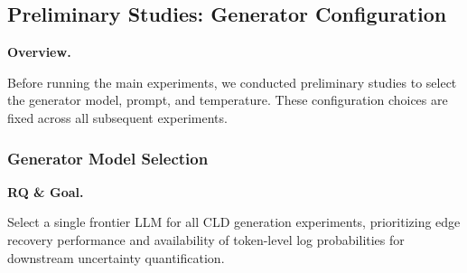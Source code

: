 \begingroup
\setlength{\leftskip}{1.25em}
\setlength{\parindent}{0pt}
\setlength{\parskip}{2pt}
\makeatletter
\renewcommand{\paragraph}[1]{\par\noindent\textbf{#1}\par\noindent}
\renewcommand{\subparagraph}[1]{\par\noindent\textbf{#1}\par\noindent}
\makeatother

\subsection{Preliminary Studies: Generator Configuration}
\label{sec:preliminary_studies}

\paragraph{Overview.}
Before running the main experiments, we conducted preliminary studies to select the generator model, prompt, and temperature. These configuration choices are fixed across all subsequent experiments.

\subsubsection{Generator Model Selection}

\paragraph{RQ \& Goal.}
Select a single frontier LLM for all CLD generation experiments, prioritizing edge recovery performance and availability of token-level log probabilities for downstream uncertainty quantification.

